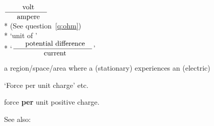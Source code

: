 \begin{question}%

  $\frac{\text{\refterm{volt}}}{\text{\refterm{ampere}}}$~\hfill{}\\*
  (See question~\ref{q:ohm}) \\*
  \NOT `unit of '\vspace{0.5em}\\*
  \NOT `$\frac{\text{\refterm{potential difference}}}{\text{\refterm{current}}}$'
\end{question}

\begin{question}%

  a region/space/area where a (stationary)  experiences an (electric) ~\hfill{}

  \NOT `Force per unit charge' etc.
\end{question}

\begin{question}%

  force \textbf{per} unit positive charge.~\hfill{}

  See also: 
\end{question}

